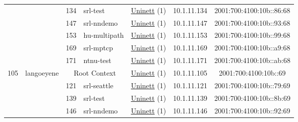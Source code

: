 \begin{small}
\begin{center}
\begin{longtable}{|c|c|c|c|c|c|c|c|}
  &  & \tiny{134} & \multicolumn{1}{|l|}{\tiny{srl-test}} & \multicolumn{2}{|c|}{\tiny{\href{https://www.uninett.no}{Uninett} (1)}} & \tiny{10.1.11.134} & \tiny{2001:700:4100:10b::86:68} \\* \cline{3-3}\cline{4-4}\cline{5-5}\cline{6-6}\cline{7-7}\cline{8-8}
  &  & \tiny{147} & \multicolumn{1}{|l|}{\tiny{srl-nndemo}} & \multicolumn{2}{|c|}{\tiny{\href{https://www.uninett.no}{Uninett} (1)}} & \tiny{10.1.11.147} & \tiny{2001:700:4100:10b::93:68} \\* \cline{3-3}\cline{4-4}\cline{5-5}\cline{6-6}\cline{7-7}\cline{8-8}
  &  & \tiny{153} & \multicolumn{1}{|l|}{\tiny{hu-multipath}} & \multicolumn{2}{|c|}{\tiny{\href{https://www.uninett.no}{Uninett} (1)}} & \tiny{10.1.11.153} & \tiny{2001:700:4100:10b::99:68} \\* \cline{3-3}\cline{4-4}\cline{5-5}\cline{6-6}\cline{7-7}\cline{8-8}
  &  & \tiny{169} & \multicolumn{1}{|l|}{\tiny{srl-mptcp}} & \multicolumn{2}{|c|}{\tiny{\href{https://www.uninett.no}{Uninett} (1)}} & \tiny{10.1.11.169} & \tiny{2001:700:4100:10b::a9:68} \\* \cline{3-3}\cline{4-4}\cline{5-5}\cline{6-6}\cline{7-7}\cline{8-8}
  &  & \tiny{171} & \multicolumn{1}{|l|}{\tiny{ntnu-test}} & \multicolumn{2}{|c|}{\tiny{\href{https://www.uninett.no}{Uninett} (1)}} & \tiny{10.1.11.171} & \tiny{2001:700:4100:10b::ab:68} \\ \hline
 \multirow{6}{*}{\tiny{105}} & \multicolumn{1}{|l|}{\multirow{6}{*}{\tiny{langoeyene}}} & \multicolumn{2}{|c|}{\tiny{Root Context}} & \multicolumn{2}{|c|}{\tiny{\href{https://www.uninett.no}{Uninett} (1)}} & \tiny{10.1.11.105} & \tiny{2001:700:4100:10b::69} \\* \cline{3-3}\cline{4-4}\cline{5-5}\cline{6-6}\cline{7-7}\cline{8-8}
  &  & \tiny{121} & \multicolumn{1}{|l|}{\tiny{srl-seattle}} & \multicolumn{2}{|c|}{\tiny{\href{https://www.uninett.no}{Uninett} (1)}} & \tiny{10.1.11.121} & \tiny{2001:700:4100:10b::79:69} \\* \cline{3-3}\cline{4-4}\cline{5-5}\cline{6-6}\cline{7-7}\cline{8-8}
  &  & \tiny{139} & \multicolumn{1}{|l|}{\tiny{srl-test}} & \multicolumn{2}{|c|}{\tiny{\href{https://www.uninett.no}{Uninett} (1)}} & \tiny{10.1.11.139} & \tiny{2001:700:4100:10b::8b:69} \\* \cline{3-3}\cline{4-4}\cline{5-5}\cline{6-6}\cline{7-7}\cline{8-8}
  &  & \tiny{146} & \multicolumn{1}{|l|}{\tiny{srl-nndemo}} & \multicolumn{2}{|c|}{\tiny{\href{https://www.uninett.no}{Uninett} (1)}} & \tiny{10.1.11.146} & \tiny{2001:700:4100:10b::92:69} \\* \cline{3-3}\cline{4-4}\cline{5-5}\cline{6-6}\cline{7-7}\cline{8-8}

\end{longtable}
\end{center}
\end{small}
